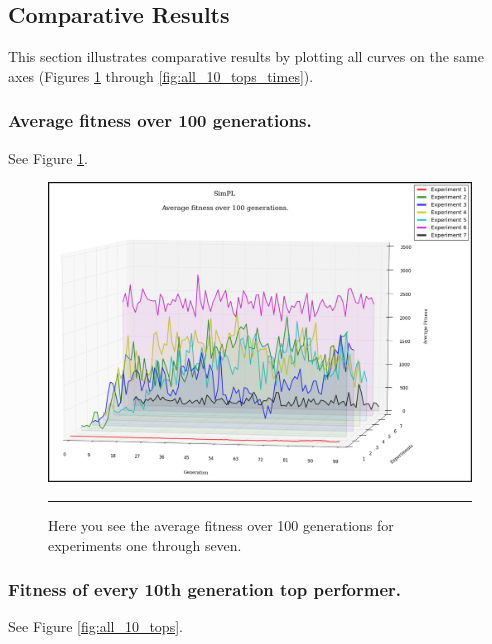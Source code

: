 \subsection{Comparative Results}

This section illustrates comparative results by plotting all curves on the same axes (Figures \ref{fig:all_avg_fit} through \ref{fig:all_10_tops_times}).

\subsubsection{Average fitness over 100 generations.}

See Figure \ref{fig:all_avg_fit}.

\begin{figure}[htbp]  
  \centering
  \includegraphics[width=5in]{../Figures/Chapter3/all_avg_fit.png}
  \rule{35em}{0.5pt}
  \caption[Average Fitness Composite]{Here you see the average fitness over 100 generations for experiments one through seven.}
  \label{fig:all_avg_fit}
\end{figure}

\subsubsection{Fitness of every 10th generation top performer.}

See Figure \ref{fig:all_10_tops}.

